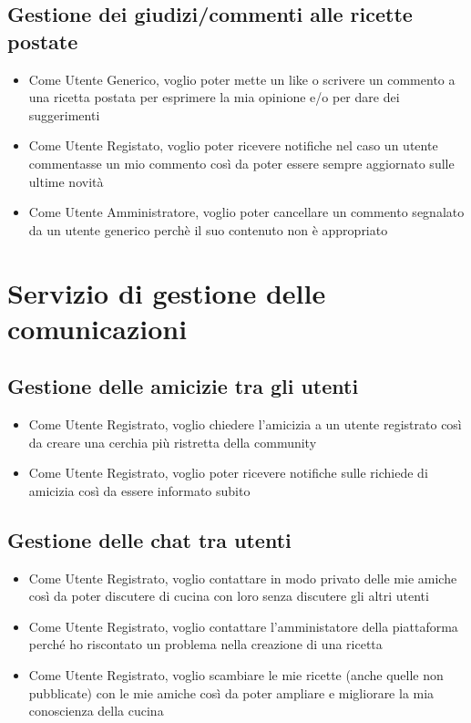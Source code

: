 \documentclass{article}
\begin{document}
\subsection{Gestione dei giudizi/commenti alle ricette postate}
\begin{itemize}
    \item Come Utente Generico, voglio poter mette un like o scrivere un commento a una ricetta postata per 
    esprimere la mia opinione e/o per dare dei suggerimenti
    \item Come Utente Registato, voglio poter ricevere notifiche nel caso un utente commentasse un mio commento 
    così da poter essere sempre aggiornato sulle ultime novità
    \item Come Utente Amministratore, voglio poter cancellare un commento segnalato da un utente generico perchè 
    il suo contenuto non è appropriato 
\end{itemize}

\section{Servizio di gestione delle comunicazioni}
\subsection{Gestione delle amicizie tra gli utenti}
\begin{itemize}
    \item Come Utente Registrato, voglio chiedere l'amicizia a un utente registrato così da creare una cerchia 
    più ristretta della community
    \item Come Utente Registrato, voglio poter ricevere notifiche sulle richiede di amicizia così da essere 
    informato subito
\end{itemize}

\subsection{Gestione delle chat tra utenti}
\begin{itemize}
    \item Come Utente Registrato, voglio contattare in modo privato delle mie amiche così da poter discutere di 
    cucina con loro senza discutere gli altri utenti
    \item Come Utente Registrato, voglio contattare l'amministatore della piattaforma perché ho riscontato un 
    problema nella creazione di una ricetta
    \item Come Utente Registrato, voglio scambiare le mie ricette (anche quelle non pubblicate) con le mie amiche 
    così da poter ampliare e migliorare la mia conoscienza della cucina    
\end{itemize}
\end{document}
